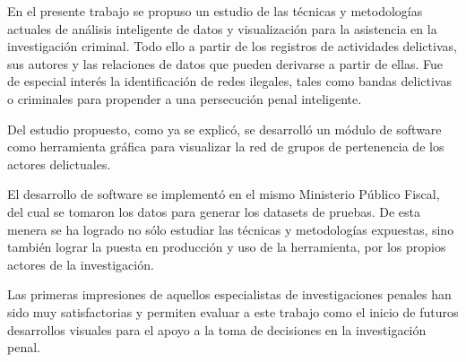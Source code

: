 
En el presente trabajo se propuso un estudio de las técnicas y metodologías actuales de análisis inteligente de datos y visualización para la asistencia en la investigación criminal. Todo ello a partir de los registros de actividades delictivas, sus autores y las relaciones de datos que pueden derivarse a partir de ellas. Fue de especial interés la identificación de redes ilegales, tales como bandas delictivas o criminales para propender a una persecución penal inteligente.

Del estudio propuesto, como ya se explicó, se desarrolló un módulo de software como herramienta gráfica para visualizar la red de grupos de pertenencia de los actores delictuales.

El desarrollo de software se implementó en el mismo Ministerio Público Fiscal, del cual se tomaron los datos para generar los datasets de pruebas. De esta menera se ha logrado no sólo estudiar las técnicas y metodologías expuestas, sino también lograr la puesta en producción y uso de la herramienta, por los propios actores de la investigación.

Las primeras impresiones de aquellos especialistas de investigaciones penales han sido muy satisfactorias y permiten evaluar a este trabajo como el inicio de futuros desarrollos visuales para el apoyo a la toma de decisiones en la investigación penal.
